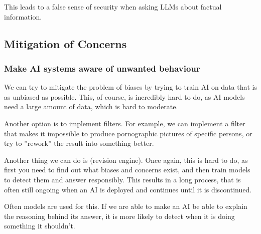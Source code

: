 \documentclass[
../../EiKI_Summary.tex,
]
{subfiles}
\begin{document}
This leads to a false sense of security when asking LLMs about factual information.

\subsection{Mitigation of Concerns}
\subsubsection{Make AI systems aware of unwanted behaviour}
We can try to mitigate the problem of biases by trying to train AI on data that is as unbiased as possible. This, of course, is incredibly hard to do, as AI models need a large amount of data, which is hard to moderate. 

Another option is to implement filters. For example, we can implement a filter that makes it impossible to produce pornographic pictures of specific persons, or try to ''rework'' the result into something better.

Another thing we can do is  (revision engine). Once again, this is hard to do, as first you need to find out what biases and concerns exist, and then train models to detect them and answer responsibly. This results in a long process, that is often still ongoing when an AI is deployed and continues until it is discontinued.

Often  models are used for this. If we are able to make an AI be able to explain the reasoning behind its answer, it is more likely to detect when it is doing something it shouldn't.
\end{document}
